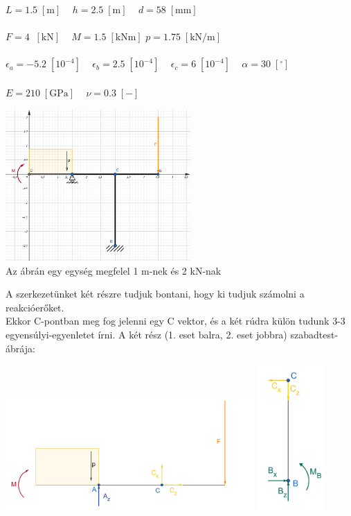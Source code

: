 \documentclass[10pt, a4paper]{article}
\newcommand{\adat}{\begin{trivlist}\item[\hskip \labelsep {\bfseries 
			{Adatok:}}]\end{trivlist}}
\newcommand{\egy}{\begin{trivlist}\item[\hskip \labelsep {\bfseries 
			{1. Feladat:}}]\end{trivlist}}
\newcommand{\knm}{\;\mathrm{\left[kNm\right]}}
\newcommand{\kn}{\;\mathrm{\left[kN\right]}}
\newcommand{\meter}{\mathrm{\left[m\right]}}
\newcommand{\pknm}{\mathrm{\left[kN/m\right]}}
\newcommand{\mm}{\mathrm{\left[mm\right]}}
\newcommand{\minegy}{\mathrm{\left[10^{-4}\right]}}
\newcommand{\dimnel}{\mathrm{\left[-\right]}}
\newcommand{\fok}{\mathrm{\left[^\circ\right]}}
\newcommand{\gpa}{\mathrm{\left[GPa\right]}}
\begin{document}
	
	\adat
	$ L = 1.5\;\meter \;\;\;$ $ h = 2.5\;\meter \;\;\;$ $ d = 58\;\mm$\\\\
	$ F = 4\;\kn \;\;\; $ $ M = 1.5\knm $ $ p = 1.75\;\pknm \;\;\;$\\\\
	$ \epsilon_a = -5.2\;\minegy \;\;\;$ $ \epsilon_b = 2.5\;\minegy \;\;\;$ $ \epsilon_c = 6\;\minegy \;\;\;$ $ \alpha = 30\;\fok \;\;\;$\\\\
	$ E = 210\;\gpa \;\;\;$ $ \nu = 0.3\;\dimnel \;\;\;$
	\setcounter{page}{1}
	\egy
	\begin{center}
		\includegraphics[width=200pt]{ meretarany.png }\\
		Az ábrán egy egység megfelel 1 m-nek és 2 kN-nak
	\end{center}
	A szerkezetünket két részre tudjuk bontani, hogy ki tudjuk számolni a reakcióerőket.\\
	Ekkor C-pontban meg fog jelenni egy C vektor, és a két rúdra külön tudunk 3-3 egyensúlyi-egyenletet írni.
	A két rész (1. eset balra, 2. eset jobbra) szabadtest-ábrája:
	\begin{center}
		\includegraphics[width=270pt]{ SZTA1.png }
		\includegraphics[width=70pt]{ SZTA2.png }
	\end{center}
\end{document}
